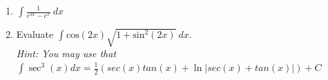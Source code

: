 \documentclass[12pt]{article}
\begin{document}
\begin{enumerate}
\pagebreak
\item $\displaystyle\int  \displaystyle\frac{1}{e^{3x}-e^x} \ dx$
\vfill
\item Evaluate  $\displaystyle\int  \displaystyle\mathrm{cos}(2x) \sqrt{1+\mathrm{sin}^2(2x)} \ dx$. \\
\textit{Hint: You may use that $\int \sec^3(x)dx = \frac{1}{2}\left(sec(x)tan(x)+\ln|sec(x)+tan(x)|\right)+C$}
\vfill

\end{enumerate} 
\end{document}
